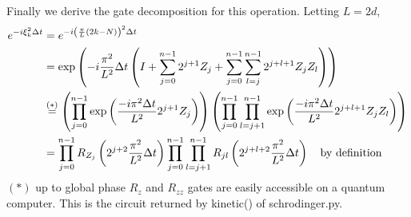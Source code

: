 \documentclass[10pt]{article}
\begin{document}
Finally we derive the gate decomposition for this operation. Letting $L = 2d$,
\begin{align*}
    e^{-i \xi_k^2 \Delta t} &= e^{-i \left(\frac{\pi}{L}(2k-N)\right)^2 \Delta t} \\
                            &= \exp\left(-i \frac{\pi^2}{L^2} \Delta t\left(I + \sum_{j=0}^{n-1} 2^{j+1} Z_j + \sum_{j=0}^{n-1} \sum_{l=j}^{n-1} 2^{j+l+1} Z_j Z_l\right)\right) \\
                            &\stackrel{(*)}{=} \left(\prod_{j=0}^{n-1} \exp\left( \frac{-i \pi^2 \Delta t}{L^2} 2^{j+1} Z_j \right)\right) \left( \prod_{j=0}^{n-1} \prod_{l=j+1}^{n-1} \exp\left(
                            \frac{-i \pi^2 \Delta t}{L^2} 2^{j+l+1} Z_j Z_l \right)\right) \\
                            &= \prod_{j=0}^{n-1} R_{Z_j}\left(2^{j+2} \frac{\pi^2}{L^2} \Delta t\right) \prod_{j=0}^{n-1} \prod_{l=j+1}^{n-1} R_{jl}\left(2^{j+l+2} \frac{\pi^2}{L^2} \Delta t\right) 
                            \text{\quad by definition}
\end{align*}
$(*)$ up to global phase \newline
$R_z$ and $R_{zz}$ gates are easily accessible on a quantum computer. This is the
circuit returned by kinetic() of schrodinger.py.
\end{document}
